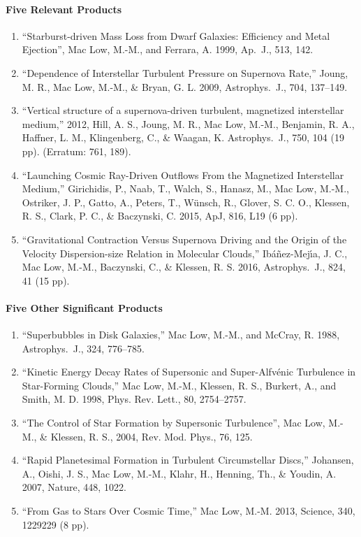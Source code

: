 \documentclass[11pt]{article}
\begin{document}
\paragraph{Five Relevant Products}
\begin{enumerate}
\setlength{\itemsep}{-\parsep}
\setlength{\topsep}{-2\parsep}
\setlength{\partopsep}{-2\parsep}
\item ``Starburst-driven Mass Loss from Dwarf Galaxies: Efficiency
     and Metal Ejection'', Mac Low, M.-M., and Ferrara, A. 1999, 
     Ap.\ J., 513, 142.
\item ``Dependence of Interstellar Turbulent Pressure on Supernova
  Rate,'' Joung, M. R., Mac Low, M.-M., \& Bryan, G. L. 2009,
  Astrophys.\ J., 704, 137--149.
\item ``Vertical structure of a supernova-driven turbulent, magnetized
  interstellar medium,'' 2012, Hill, A. S., Joung, M. R., Mac Low,
  M.-M., Benjamin, R. A., Haffner, L. M., Klingenberg, C., \& Waagan,
  K. Astrophys.\ J., 750, 104 (19 pp).  (Erratum: 761, 189).
\item ``Launching Cosmic Ray-Driven Outflows From the Magnetized
  Interstellar Medium,'' Girichidis, P., Naab, T., Walch, S., Hanasz,
  M., Mac Low, M.-M., Ostriker, J. P., Gatto, A., Peters, T.,
  W\"unsch, R., Glover, S. C. O., Klessen, R. S., Clark, P. C., \&
  Baczynski, C. 2015, ApJ, 816, L19 (6 pp).
\item ``Gravitational Contraction Versus Supernova Driving and the
  Origin of the Velocity Dispersion-size Relation in Molecular
  Clouds,'' Ib\'a\~nez-Mej\'{\i}a, J. C., Mac Low, M.-M., Baczynski,
  C., \& Klessen, R. S. 2016, Astrophys.\ J., 824, 41 (15 pp).

\end{enumerate}
\paragraph{Five Other Significant Products}
\begin{enumerate}
\setlength{\itemsep}{-\parsep}
\setlength{\topsep}{-\parsep}
\item ``Superbubbles in Disk Galaxies,'' Mac Low, M.-M., and McCray, R.  1988,
Astrophys.\ J., 324, 776--785.
\item ``Kinetic Energy Decay Rates of Supersonic and Super-Alfv\'enic
Turbulence in Star-Forming Clouds,'' Mac Low, M.-M., Klessen, R. S.,
Burkert, A., and Smith, M. D. 1998, Phys. Rev. Lett., 80, 2754--2757.
\item ``The Control of Star Formation by Supersonic Turbulence'', Mac
Low, M.-M., \& Klessen, R. S., 2004, Rev. Mod. Phys., 76, 125. 
\item ``Rapid Planetesimal Formation in Turbulent Circumstellar Discs,''
Johansen, A., Oishi, J. S., Mac Low, M.-M., Klahr, H., Henning, Th.,
\& Youdin, A. 2007, Nature, 448, 1022.
\item ``From Gas to Stars Over Cosmic Time,'' Mac Low, M.-M. 2013,
  Science, 340, 1229229 (8 pp).

\end{enumerate}
\end{document}
